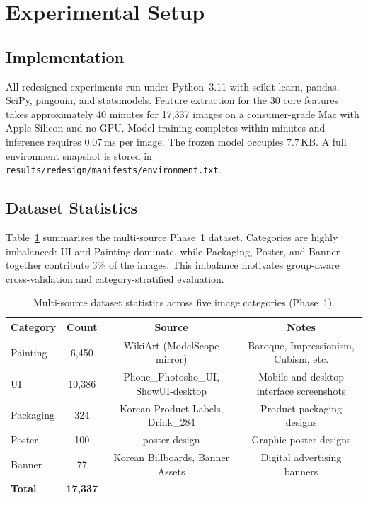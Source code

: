 
\section{Experimental Setup}
\label{sec:experiments}

\subsection{Implementation}

All redesigned experiments run under Python~3.11 with scikit-learn, pandas, SciPy, pingouin, and statsmodels. Feature extraction for the 30 core features takes approximately 40 minutes for 17,337 images on a consumer-grade Mac with Apple Silicon and no GPU. Model training completes within minutes and inference requires 0.07\,ms per image. The frozen model occupies 7.7\,KB. A full environment snapshot is stored in \texttt{results/redesign/manifests/environment.txt}.

\subsection{Dataset Statistics}

Table~\ref{tab:dataset_stats} summarizes the multi-source Phase~1 dataset. Categories are highly imbalanced: UI and Painting dominate, while Packaging, Poster, and Banner together contribute 3\% of the images. This imbalance motivates group-aware cross-validation and category-stratified evaluation.

\begin{table}[htbp]
\centering
\caption{Multi-source dataset statistics across five image categories (Phase~1).}
\label{tab:dataset_stats}
\begin{tabular}{@{}lccc@{}}
\toprule
Category & Count & Source & Notes \\
\midrule
Painting & 6,450 & WikiArt (ModelScope mirror) & Baroque, Impressionism, Cubism, etc. \\
UI & 10,386 & Phone\_Photosho\_UI, ShowUI-desktop & Mobile and desktop interface screenshots \\
Packaging & 324 & Korean Product Labels, Drink\_284 & Product packaging designs \\
Poster & 100 & poster-design & Graphic poster designs \\
Banner & 77 & Korean Billboards, Banner Assets & Digital advertising banners \\
\midrule
\textbf{Total} & \textbf{17,337} & & \\
\bottomrule
\end{tabular}
\end{table}

